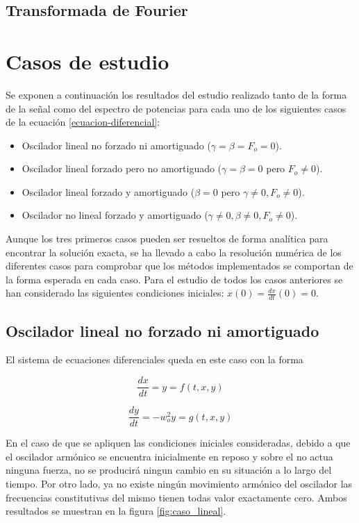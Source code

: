 \documentclass[11pt]{article}
\begin{document}
\subsection{Transformada de Fourier}

\section{Casos de estudio}
Se exponen a continuación los resultados del estudio realizado tanto de la forma de la señal como del espectro de potencias para cada uno de los siguientes casos de la ecuación \ref{ecuacion-diferencial}:

\begin{itemize}
	\item Oscilador lineal no forzado ni amortiguado ($\gamma = \beta = F_o = 0$).
	\item Oscilador lineal forzado pero no amortiguado ($\gamma = \beta = 0$ pero $F_o \neq 0$).
	\item Oscilador lineal forzado y amortiguado ($\beta = 0$ pero $\gamma \neq 0, F_o \neq0$).
	\item Oscilador no lineal forzado y amortiguado ($\gamma \neq 0, \beta \neq 0, F_o \neq 0$).
\end{itemize}

Aunque los tres primeros casos pueden ser resueltos de forma analítica para encontrar la solución exacta, se ha llevado a cabo la resolución numérica de los diferentes casos para comprobar que los métodos implementados se comportan de la forma esperada en cada caso. Para el estudio de todos los casos anteriores se han considerado las siguientes condiciones iniciales: $x(0) = \frac{dx}{dt}(0) = 0$.

\subsection{Oscilador lineal no forzado ni amortiguado}
El sistema de ecuaciones diferenciales queda en este caso con la forma 

\begin{equation}
	\frac{dx}{dt} = y = f(t, x, y)
\end{equation}

\begin{equation}
	\frac{dy}{dt} = -w_o^2 y = g(t, x, y)
\end{equation}

En el caso de que se apliquen las condiciones iniciales consideradas, debido a que el oscilador armónico se encuentra inicialmente en reposo y sobre el no actua ninguna fuerza, no se producirá ningun cambio en su situación a lo largo del tiempo. Por otro lado, ya no existe ningún movimiento armónico del oscilador las frecuencias constitutivas del mismo tienen todas valor exactamente cero. Ambos resultados se muestran en la figura \ref{fig:caso_lineal}.
\end{document}
